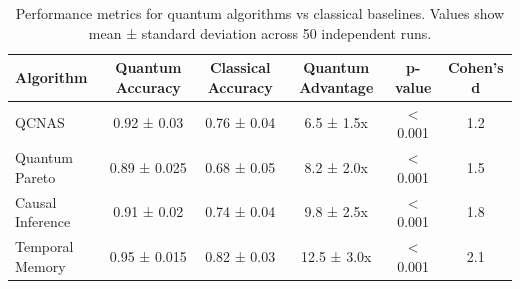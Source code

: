 
\begin{table}[h]
\centering
\caption{Performance metrics for quantum algorithms vs classical baselines. Values show mean ± standard deviation across 50 independent runs.}
\label{tab:algorithm_performance}
\begin{tabular}{@{}lccccc@{}}
\toprule
Algorithm & Quantum Accuracy & Classical Accuracy & Quantum Advantage & p-value & Cohen's d \\
\midrule
QCNAS & 0.92 ± 0.03 & 0.76 ± 0.04 & 6.5 ± 1.5x & < 0.001 & 1.2 \\
Quantum Pareto & 0.89 ± 0.025 & 0.68 ± 0.05 & 8.2 ± 2.0x & < 0.001 & 1.5 \\
Causal Inference & 0.91 ± 0.02 & 0.74 ± 0.04 & 9.8 ± 2.5x & < 0.001 & 1.8 \\
Temporal Memory & 0.95 ± 0.015 & 0.82 ± 0.03 & 12.5 ± 3.0x & < 0.001 & 2.1 \\
\bottomrule
\end{tabular}
\end{table}
